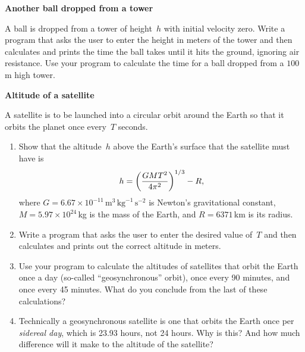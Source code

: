 \documentclass[12pt]{article}
\begin{document}
\par
\bigskip
{}\par
\noindent\hrulefill


\begin{exercises}


\exercise \textbf{Another ball dropped from a tower}

\exskip A ball is dropped from a tower of height~$h$ with initial velocity
zero.  Write a program that asks the user to enter the height in meters of
the tower and then calculates and prints the time the ball takes until it
hits the ground, ignoring air resistance.  Use your program to calculate
the time for a ball dropped from a $100\,$m high tower.



\exercise \textbf{Altitude of a satellite}

\exskip A satellite is to be launched into a circular orbit around the
Earth so that it orbits the planet once every~$T$ seconds.
\begin{enumerate}\setlength{\itemsep}{0pt}
\item Show that the altitude~$h$ above the Earth's surface that the
  satellite must have is
\begin{displaymath}
h = \biggl( {GMT^2\over4\pi^2} \biggr)^{1/3} - R,
\end{displaymath}
where
$G=6.67\times10^{-11}\,\textrm{m}^3\,\textrm{kg}^{-1}\,\textrm{s}^{-2}$ is
Newton's gravitational constant, $M=5.97\times10^{24}\,$kg is the mass of
the Earth, and $R=6371\,$km is its radius.
\item Write a program that asks the user to enter the desired value of~$T$
  and then calculates and prints out the correct altitude in meters.
\item Use your program to calculate the altitudes of satellites that orbit
  the Earth once a day (so-called ``geosynchronous'' orbit), once every 90
  minutes, and once every 45 minutes.  What do you conclude from the last
  of these calculations?
\item Technically a geosynchronous satellite is one that orbits the Earth
  once per \textit{sidereal day}, which is 23.93 hours, not 24 hours.  Why
  is this?  And how much difference will it make to the altitude of the
  satellite?
\end{enumerate}



\end{exercises}
\end{document}
